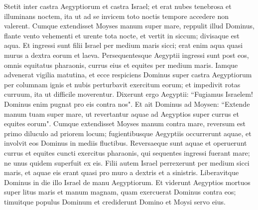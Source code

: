 \begin{biblechapter}
\verse Stetit inter castra Aegyptiorum et castra Israel; et erat nubes tenebrosa et illuminans noctem, ita ut ad se invicem toto noctis tempore accedere non valerent. 
\verse Cumque extendisset Moyses manum super mare, reppulit illud Dominus, flante vento vehementi et urente tota nocte, et vertit in siccum; divisaque est aqua. 
\verse Et ingressi sunt filii Israel per medium maris sicci; erat enim aqua quasi murus a dextra eorum et laeva. 
\verse Persequentesque Aegyptii ingressi sunt post eos, omnis equitatus pharaonis, currus eius et equites per medium maris. 
\verse Iamque advenerat vigilia matutina, et ecce respiciens Dominus super castra Aegyptiorum per columnam ignis et nubis perturbavit exercitum eorum; 
\verse et impedivit rotas curruum, ita ut difficile moverentur. Dixerunt ergo Aegyptii: “Fugiamus Israelem! Dominus enim pugnat pro eis contra nos". 
\verse Et ait Dominus ad Moysen: “Extende manum tuam super mare, ut revertantur aquae ad Aegyptios super currus et equites eorum". 
\verse Cumque extendisset Moyses manum contra mare, reversum est primo diluculo ad priorem locum; fugientibusque Aegyptiis occurrerunt aquae, et involvit eos Dominus in mediis fluctibus. 
\verse Reversaeque sunt aquae et operuerunt currus et equites cuncti exercitus pharaonis, qui sequentes ingressi fuerant mare; ne unus quidem superfuit ex eis. 
\verse Filii autem Israel perrexerunt per medium sicci maris, et aquae eis erant quasi pro muro a dextris et a sinistris. 
\verse Liberavitque Dominus in die illo Israel de manu Aegyptiorum. Et viderunt Aegyptios mortuos super litus maris 
\verse et manum magnam, quam exercuerat Dominus contra eos; timuitque populus Dominum et crediderunt Domino et Moysi servo eius. 
\end{biblechapter}

